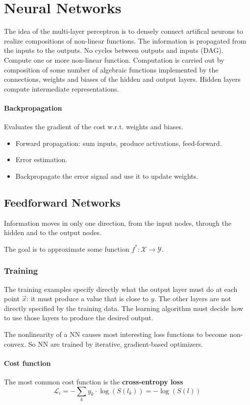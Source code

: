 \documentclass[a4paper,6pt,twocolumn,fleqn]{article}
\begin{document}
\section{Neural Networks}
The idea of the multi-layer perceptron is to densely connect artifical neurons to realize compositions of non-linear functions. The information is propagated from the inputs to the outputs. No cycles between outputs and inputs (DAG). Compute one or more non-linear function. Computation is carried out by composition of some number of algebraic functions implemented by the connections, weights and biases of the hidden and output layers. Hidden layers compute intermediate representations.

\paragraph{Backpropagation}
Evaluates the gradient of the cost w.r.t. weights and biases.
\begin{itemize}
    \item Forward propagation: sum inputs, produce activations, feed-forward.
    \item Error estimation.
    \item Backpropagate the error signal and use it to update weights.
\end{itemize}
\subsection{Feedforward Networks} %
Information moves in only one direction, from the input nodes, through the hidden and to the output nodes.

The goal is to approximate some function \(f^* : \mathcal X \to \mathcal Y\).

\subsubsection{Training} %
The training examples specify directly what the output layer must do at each point \(\vec x\): it must produce a value that is close to \(y\). The other layers are not directly specified by the training data. The learning algorithm must decide how to use those layers to produce the desired output.

The nonlinearity of a NN causes most interesting loss functions to become non-convex. So NN are trained by iterative, gradient-based optimizers.

\paragraph{Cost function} The most common cost function is the \textbf{cross-entropy loss}
\begin{equation}
    \mathcal L_i = - \sum_k y_k \cdot \log(S(l_k)) = - \log(S(l))
\end{equation}
\end{document}
